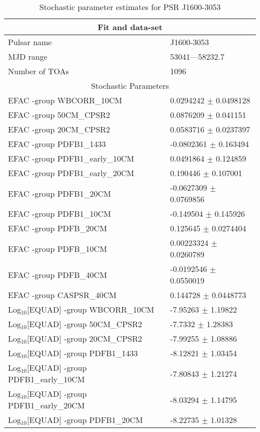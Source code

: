 \documentclass{article}
\begin{document}
\begin{table*}
\caption{Stochastic parameter estimates for PSR J1600-3053}
\begin{tabular}{ll}
\hline\hline
\multicolumn{2}{c}{Fit and data-set} \\ 
\hline
Pulsar name\dotfill & J1600-3053 \\ 
MJD range\dotfill & 53041---58232.7 \\ 
Number of TOAs\dotfill & 1096 \\
\hline
\multicolumn{2}{c}{Stochastic Parameters} \\ 
\hline
EFAC -group WBCORR_10CM \dotfill & 0.0294242 $\pm$ 0.0498128  \\ 
EFAC -group 50CM_CPSR2 \dotfill & 0.0876209 $\pm$ 0.041151  \\ 
EFAC -group 20CM_CPSR2 \dotfill & 0.0583716 $\pm$ 0.0237397  \\ 
EFAC -group PDFB1_1433 \dotfill & -0.0802361 $\pm$ 0.163494  \\ 
EFAC -group PDFB1_early_10CM \dotfill & 0.0491864 $\pm$ 0.124859  \\ 
EFAC -group PDFB1_early_20CM \dotfill & 0.190446 $\pm$ 0.107001  \\ 
EFAC -group PDFB1_20CM \dotfill & -0.0627309 $\pm$ 0.0769856  \\ 
EFAC -group PDFB1_10CM \dotfill & -0.149504 $\pm$ 0.145926  \\ 
EFAC -group PDFB_20CM \dotfill & 0.125645 $\pm$ 0.0274404  \\ 
EFAC -group PDFB_10CM \dotfill & 0.00223324 $\pm$ 0.0260789  \\ 
EFAC -group PDFB_40CM \dotfill & -0.0192546 $\pm$ 0.0550019  \\ 
EFAC -group CASPSR_40CM \dotfill & 0.144728 $\pm$ 0.0448773  \\ 
Log$_{10}$[EQUAD] -group WBCORR_10CM \dotfill & -7.95263 $\pm$ 1.19822  \\ 
Log$_{10}$[EQUAD] -group 50CM_CPSR2 \dotfill & -7.7332 $\pm$ 1.28383  \\ 
Log$_{10}$[EQUAD] -group 20CM_CPSR2 \dotfill & -7.99255 $\pm$ 1.08886  \\ 
Log$_{10}$[EQUAD] -group PDFB1_1433 \dotfill & -8.12821 $\pm$ 1.03454  \\ 
Log$_{10}$[EQUAD] -group PDFB1_early_10CM \dotfill & -7.80843 $\pm$ 1.21274  \\ 
Log$_{10}$[EQUAD] -group PDFB1_early_20CM \dotfill & -8.03294 $\pm$ 1.14795  \\ 
Log$_{10}$[EQUAD] -group PDFB1_20CM \dotfill & -8.22735 $\pm$ 1.01328  \\ 

\end{tabular}
\end{table*}
\end{document}
